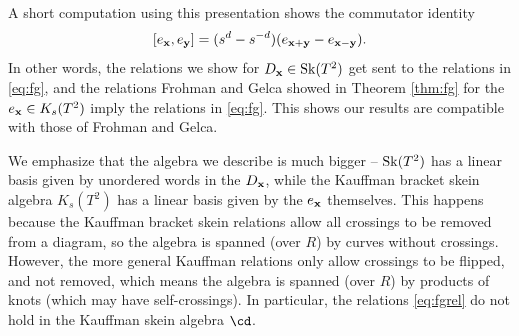 A short computation using this presentation shows  the commutator identity
\begin{equation}\label{eq:fg}
[e_{\mathbf{x}}, e_{\mathbf{y}}] = (s^d-s^{-d}) (e_{{\mathbf{x}}+{\mathbf{y}}} - e_{{\mathbf{x}}-{\mathbf{y}}}).
\end{equation}
In other words, the relations we show for $D_{\mathbf{x}} \in \mathrm{Sk}(T^2)$ get sent to the relations in \eqref{eq:fg}, and the relations Frohman and Gelca showed in Theorem \ref{thm:fg} for the $e_{\mathbf{x}} \in K_s(T^2)$ imply the relations in \eqref{eq:fg}. This shows our results are compatible with those of Frohman and Gelca.

\begin{remark}\label{rmk:sobig}
We emphasize that the algebra we describe is much bigger -- $\mathrm{Sk}(T^2)$ has a linear basis given by unordered words in the $D_{\mathbf{x}}$, while the Kauffman bracket skein algebra $K_s(T^2)$ has a linear basis given by the $e_{\mathbf{x}}$ themselves. This happens because the Kauffman bracket skein relations allow all crossings to be removed from a diagram, so the algebra is spanned (over $R$) by curves without crossings. However, the more general Kauffman relations only allow crossings to be flipped, and not removed, which means the algebra is spanned (over $R$) by products of knots (which may have self-crossings). In particular, the relations \eqref{eq:fgrel} do not hold in the Kauffman skein algebra $\cd$.
\end{remark}

